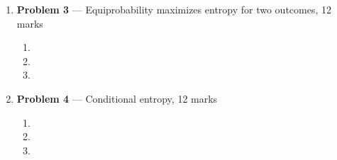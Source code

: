 \documentclass[11pt]{article}
\theoremstyle{definition}
\begin{document}
\begin{enumerate}
\newpage

\item[] \textbf{Problem 3} --- Equiprobability maximizes entropy for two outcomes, 12 marks


\begin{enumerate}
\item
\item

\item

\end{enumerate}

\newpage

\item[] \textbf{Problem 4} --- Conditional entropy, 12 marks

\begin{enumerate}
\item

\item
\item
\end{enumerate}
\end{enumerate}

\newpage
\end{document}
